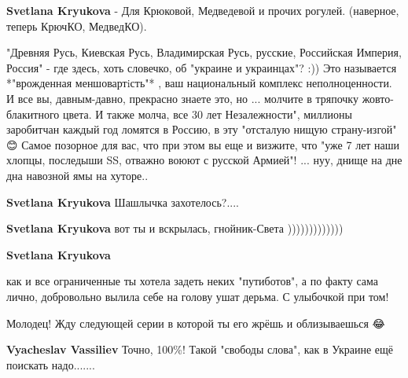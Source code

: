 \begin{itemize}
\begin{itemize}
\textbf{Svetlana Kryukova} - Для Крюковой, Медведевой и прочих рогулей. (наверное, теперь КрючКО, МедведКО).

"Древняя Русь, Киевская Русь, Владимирская Русь, русские, Российская Империя,
Россия" - где здесь, хоть словечко, об "украине и украинцах"? :)) Это
называется *"врожденная меншовартiсть"* , ваш национальный комплекс
неполноценности. И все вы, давным-давно, прекрасно знаете это, но ... молчите в
тряпочку жовто-блакитного цвета. И также молча, все 30 лет Незалежности",
миллионы заробитчан каждый год ломятся в Россию, в эту "отсталую нищую
страну-изгой" 😊 Самое позорное для вас, что при этом вы еще и визжите, что
"уже 7 лет наши хлопцы, последыши SS, отважно воюют с русской Армией"! ... нуу,
днище на дне дна навозной ямы на хуторе..


 
\textbf{Svetlana Kryukova} Шашлычка захотелось?....🤣😂😭

 
\textbf{Svetlana Kryukova} вот ты и вскрылась, гнойник-Света )))))))))))))

 
\textbf{Svetlana Kryukova} 

как и все ограниченные ты хотела задеть неких "путиботов", а по факту сама
лично, добровольно вылила себе на голову ушат дерьма. С улыбочкой при том!

Молодец! Жду следующей серии в которой ты его жрёшь и облизываешься 😂

 
\textbf{Vyacheslav Vassiliev} Точно, 100\%! Такой "свободы слова", как в Украине ещё поискать надо.......


\end{itemize}
\end{itemize}
